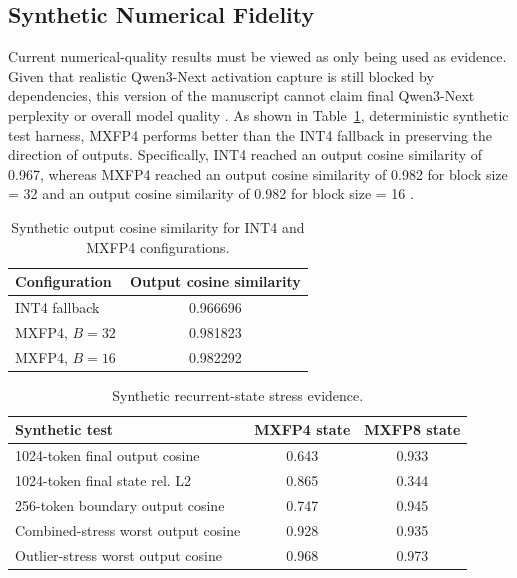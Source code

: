 ﻿\documentclass[conference]{IEEEtran}
\begin{document}
\subsection{Synthetic Numerical Fidelity}
Current numerical-quality results must be viewed as only being used as evidence. Given that realistic Qwen3-Next activation capture is still blocked by dependencies, this version of the manuscript cannot claim final Qwen3-Next perplexity or overall model quality \cite{b3}. As shown in Table~\ref{tab:accuracy_results}, deterministic synthetic test harness, MXFP4 performs better than the INT4 fallback in preserving the direction of outputs. Specifically, INT4 reached an output cosine similarity of 0.967, whereas MXFP4 reached an output cosine similarity of 0.982 for block size = 32 and an output cosine similarity of 0.982 for block size = 16 \cite{b10,b12}.

\begin{table}[t]
\centering
\caption{Synthetic output cosine similarity for INT4 and MXFP4 configurations.}
\label{tab:accuracy_results}
\footnotesize
\renewcommand{\arraystretch}{1.0}
\setlength{\tabcolsep}{6pt}
\begin{tabularx}{\linewidth}{Xc}
\toprule
Configuration & Output cosine similarity \\
\midrule
INT4 fallback & 0.966696 \\
MXFP4, $B=32$ & 0.981823 \\
MXFP4, $B=16$ & 0.982292 \\
\bottomrule
\end{tabularx}
\end{table}


\begin{table}[t]
\centering
\caption{Synthetic recurrent-state stress evidence.}
\label{tab:state_stress_results}
\footnotesize
\renewcommand{\arraystretch}{1.0}
\setlength{\tabcolsep}{6pt}
\begin{tabularx}{\linewidth}{Xcc}
\toprule
Synthetic test & MXFP4 state & MXFP8 state \\
\midrule
1024-token final output cosine & 0.643 & 0.933 \\
1024-token final state rel. L2 & 0.865 & 0.344 \\
256-token boundary output cosine & 0.747 & 0.945 \\
Combined-stress worst output cosine & 0.928 & 0.935 \\
Outlier-stress worst output cosine & 0.968 & 0.973 \\
\bottomrule
\end{tabularx}
\end{table}
\end{document}
